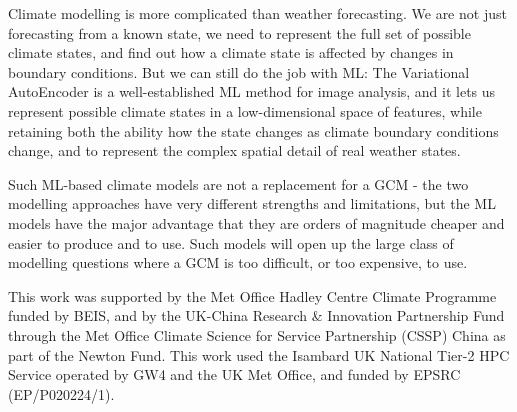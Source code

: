 \documentclass[gmd]{copernicus}
\begin{document}
Climate modelling is more complicated than weather forecasting. We are not just forecasting from a known state, we need to represent the full set of possible climate states, and find out how a climate state is affected by changes in boundary conditions. But we can still do the job with ML: The Variational AutoEncoder is a well-established ML method for image analysis, and it lets us represent possible climate states in a low-dimensional space of features, while retaining both the ability how the state changes as climate boundary conditions change, and to represent the complex spatial detail of real weather states.

Such ML-based climate models are not a replacement for a GCM - the two modelling approaches have very different strengths and limitations, but the ML models have the major advantage that they are orders of magnitude cheaper and easier to produce and to use. Such models will open up the large class of modelling questions where a GCM is too difficult, or too expensive, to use.









\begin{acknowledgements}
This work was supported by the Met Office Hadley Centre Climate Programme funded by BEIS, and by the UK-China Research \& Innovation Partnership Fund through the Met Office Climate Science for Service Partnership (CSSP) China as part of the Newton Fund.
This work used the Isambard UK National Tier-2 HPC Service operated by GW4 and the UK Met Office, and funded by EPSRC (EP/P020224/1).
\end{acknowledgements}





\end{document}
